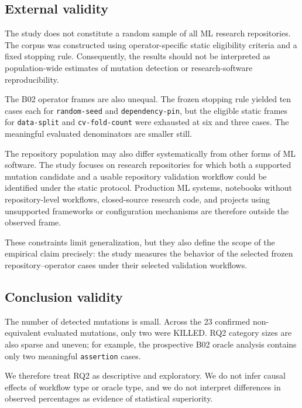 \subsection{External validity}
\label{sec:threats-external}

The study does not constitute a random sample of all ML research repositories.
The corpus was constructed using operator-specific static eligibility criteria
and a fixed stopping rule. Consequently, the results should not be interpreted
as population-wide estimates of mutation detection or research-software
reproducibility.

The B02 operator frames are also unequal. The frozen stopping rule yielded ten
cases each for \texttt{random-seed} and \texttt{dependency-pin}, but the
eligible static frames for \texttt{data-split} and \texttt{cv-fold-count} were
exhausted at six and three cases. The meaningful evaluated denominators are
smaller still.

The repository population may also differ systematically from other forms of ML
software. The study focuses on research repositories for which both a supported
mutation candidate and a usable repository validation workflow could be
identified under the static protocol. Production ML systems, notebooks without
repository-level workflows, closed-source research code, and projects using
unsupported frameworks or configuration mechanisms are therefore outside the
observed frame.

These constraints limit generalization, but they also define the scope of the
empirical claim precisely: the study measures the behavior of the selected
frozen repository--operator cases under their selected validation workflows.


\subsection{Conclusion validity}
\label{sec:threats-conclusion}

The number of detected mutations is small. Across the 23 confirmed
non-equivalent evaluated mutations, only two were KILLED. RQ2 category sizes
are also sparse and uneven; for example, the prospective B02 oracle analysis
contains only two meaningful \texttt{assertion} cases.

We therefore treat RQ2 as descriptive and exploratory. We do not infer causal
effects of workflow type or oracle type, and we do not interpret differences in
observed percentages as evidence of statistical superiority.


